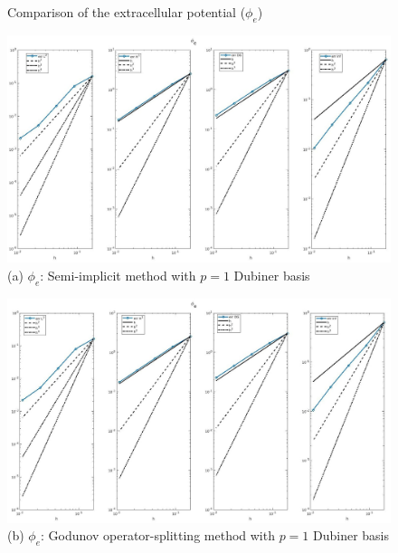 \documentclass[a4paper,11pt]{article}
\begin{document}
\begin{figure}[h]
\caption{Comparison of the extracellular potential ($\phi_e$)}
\label{pe-time}
\begin{center}
\includegraphics[width = \textwidth]{./D1_Phie_1.jpg}
\caption*{(a) $\phi_e$: Semi-implicit method with $p=1$ Dubiner basis}
\end{center}
\end{figure}
\begin{figure}[H]
\begin{center}
\includegraphics[width =\textwidth]{./D1_Phie_1_GO.jpg}
\caption*{(b) $\phi_e$: Godunov operator-splitting method with $p=1$ Dubiner basis}
\end{center}
\end{figure}
\newpage
\end{document}
